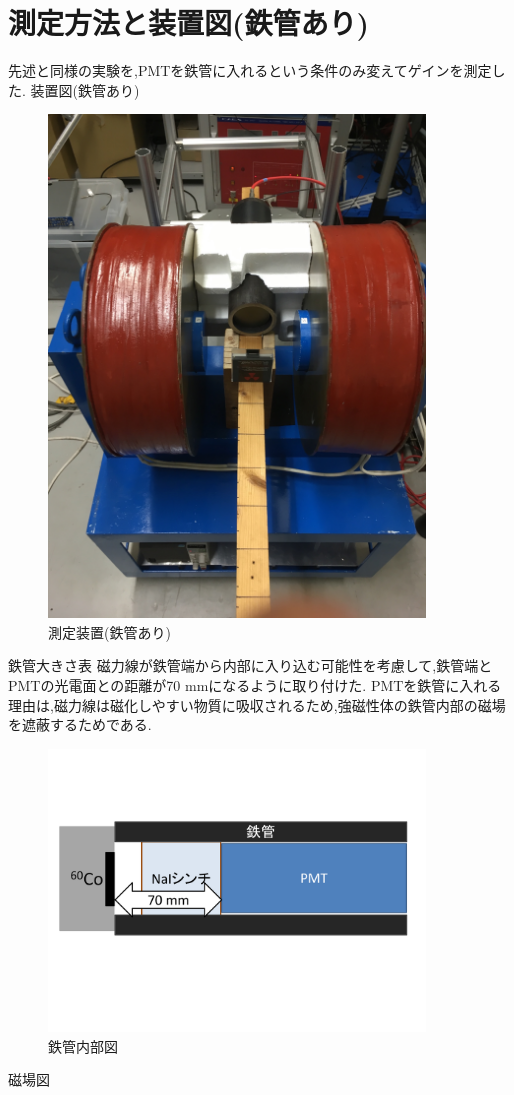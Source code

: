 \section{測定方法と装置図(鉄管あり)}
先述と同様の実験を,PMTを鉄管に入れるという条件のみ変えてゲインを測定した.
装置図(鉄管あり)
\begin{figure}[H]
	\centering
		\includegraphics[width=10cm]{fig/iguchi/2inchinFe.jpg}
	\caption{測定装置(鉄管あり)}
	\label{2inchinFe}
\end{figure}

鉄管大きさ表
磁力線が鉄管端から内部に入り込む可能性を考慮して,鉄管端とPMTの光電面との距離が70 mmになるように取り付けた.
PMTを鉄管に入れる理由は,磁力線は磁化しやすい物質に吸収されるため,強磁性体の鉄管内部の磁場を遮蔽するためである.
\begin{figure}[H]
	\centering
		\includegraphics[width=10cm]{fig/iguchi/PMTinFe.pdf}
	\caption{鉄管内部図}
	\label{PMTinFe}
\end{figure}
磁場図

